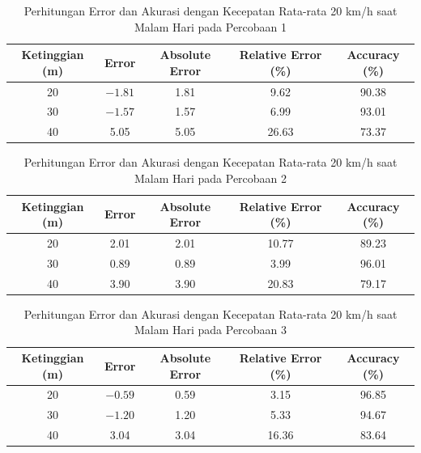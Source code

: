 \begin{table}[H]
  \caption{Perhitungan Error dan Akurasi dengan Kecepatan Rata-rata 20 km/h saat Malam Hari pada Percobaan 1}
  \label{tab:20kmh-malam-p1}
  \centering
  \begin{tabular}{|c|c|c|c|c|}
    \hline
    \textbf{Ketinggian (m)} & \textbf{Error} & \textbf{Absolute Error} & \textbf{Relative Error (\%)} & \textbf{Accuracy (\%)} \\
    \hline
    20 & \(-1.81\) & 1.81 & 9.62 & 90.38 \\
    30 & \(-1.57\) & 1.57 & 6.99 & 93.01 \\
    40 &  5.05     & 5.05 & 26.63 & 73.37 \\
    \hline
  \end{tabular}
\end{table}
\vspace{-10pt}
\begin{table}[H]
  \caption{Perhitungan Error dan Akurasi dengan Kecepatan Rata-rata 20 km/h saat Malam Hari pada Percobaan 2}
  \label{tab:20kmh-malam-p2}
  \centering
  \begin{tabular}{|c|c|c|c|c|}
    \hline
    \textbf{Ketinggian (m)} & \textbf{Error} & \textbf{Absolute Error} & \textbf{Relative Error (\%)} & \textbf{Accuracy (\%)} \\
    \hline
    20 &  2.01 & 2.01 & 10.77 & 89.23 \\
    30 &  0.89 & 0.89 &  3.99 & 96.01 \\
    40 &  3.90 & 3.90 & 20.83 & 79.17 \\
    \hline
  \end{tabular}
\end{table}
\vspace{-10pt}
\begin{table}[H]
  \caption{Perhitungan Error dan Akurasi dengan Kecepatan Rata-rata 20 km/h saat Malam Hari pada Percobaan 3}
  \label{tab:20kmh-malam-p3}
  \centering
  \begin{tabular}{|c|c|c|c|c|}
    \hline
    \textbf{Ketinggian (m)} & \textbf{Error} & \textbf{Absolute Error} & \textbf{Relative Error (\%)} & \textbf{Accuracy (\%)} \\
    \hline
    20 & \(-0.59\) & 0.59 & 3.15 & 96.85 \\
    30 & \(-1.20\) & 1.20 & 5.33 & 94.67 \\
    40 &  3.04     & 3.04 & 16.36 & 83.64 \\
    \hline
  \end{tabular}
\end{table}

